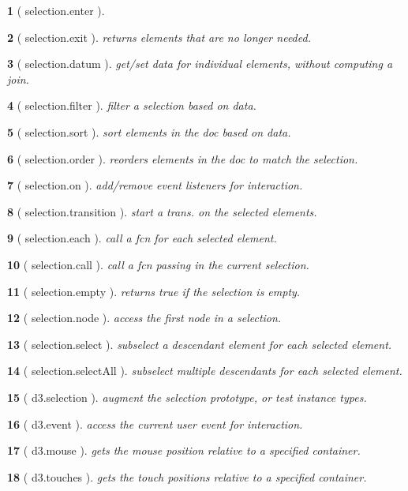 \documentclass[10pt,landscape,letterpaper]{article}
\newcounter{thm}
\newcommand{\hdrule}{\vspace{-4pt} \hdashrule[0.25ex]{\fill}{.5pt}{1pt}\vspace{-4pt}}
\theoremstyle{mytheoremstyle}
\newtheorem*{thm}{}
\begin{document}
\begin{multicols}{3}
\begin{thm} [ selection.enter ]
\end{thm}\begin{thm} [ selection.exit ]  returns elements that are no longer needed.
\end{thm}\begin{thm} [ selection.datum ]  get/set data for individual elements, without computing a join.
\end{thm}\begin{thm} [ selection.filter ]  filter a selection based on data.
\end{thm}\begin{thm} [ selection.sort ]  sort elements in the doc based on data.
\end{thm}\begin{thm} [ selection.order ]  reorders elements in the doc to match the selection.
\end{thm}\begin{thm} [ selection.on ]  add/remove event listeners for interaction.
\end{thm}\begin{thm} [ selection.transition ]  start a trans. on the selected elements.
\end{thm}\begin{thm} [ selection.each ]  call a fcn for each selected element.
\end{thm}\begin{thm} [ selection.call ]  call a fcn passing in the current selection.
\end{thm}\begin{thm} [ selection.empty ]  returns true if the selection is empty.
\end{thm}\begin{thm} [ selection.node ]  access the first node in a selection.
\end{thm}\begin{thm} [ selection.select ]  subselect a descendant element for each selected element.
\end{thm}\begin{thm} [ selection.selectAll ]  subselect multiple descendants for each selected element.
\end{thm}\begin{thm} [ d3.selection ]  augment the selection prototype, or test instance types.
\end{thm}\begin{thm} [ d3.event ]  access the current user event for interaction.
\end{thm}\begin{thm} [ d3.mouse ]  gets the mouse position relative to a specified container.
\end{thm}\begin{thm} [ d3.touches ]  gets the touch positions relative to a specified container.\end{thm}
\hdrule

\end{multicols}
\end{document}
